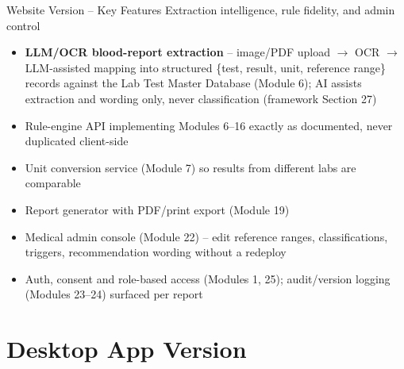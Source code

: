 \documentclass[9pt,aspectratio=169]{beamer}
\begin{document}
\begin{frame}[t]{Website Version -- Key Features}
\textcolor{black!55}{\scriptsize Extraction intelligence, rule fidelity, and admin control}\\[2pt]
\begin{itemize}
\scriptsize
\item \textbf{LLM/OCR blood-report extraction} -- image/PDF upload $\to$ OCR $\to$ LLM-assisted mapping into structured \{test, result, unit, reference range\} records against the Lab Test Master Database (Module 6); AI assists extraction and wording only, never classification (framework Section 27)
\item Rule-engine API implementing Modules 6--16 exactly as documented, never duplicated client-side
\item Unit conversion service (Module 7) so results from different labs are comparable
\item Report generator with PDF/print export (Module 19)
\item Medical admin console (Module 22) -- edit reference ranges, classifications, triggers, recommendation wording without a redeploy
\item Auth, consent and role-based access (Modules 1, 25); audit/version logging (Modules 23--24) surfaced per report
\end{itemize}
\end{frame}

\section{Desktop App Version}
\end{document}
